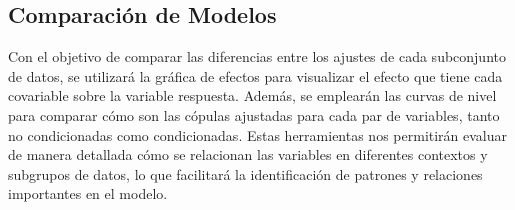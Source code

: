 
\subsection{Comparación de Modelos}

Con el objetivo de comparar las diferencias entre los ajustes de cada subconjunto de datos, se utilizará la gráfica de efectos para visualizar el efecto que tiene cada covariable sobre la variable respuesta. Además, se emplearán las curvas de nivel para comparar cómo son las cópulas ajustadas para cada par de variables, tanto no condicionadas como condicionadas. Estas herramientas nos permitirán evaluar de manera detallada cómo se relacionan las variables en diferentes contextos y subgrupos de datos, lo que facilitará la identificación de patrones y relaciones importantes en el modelo.


\begin{figure}[H]
 \centering
\end{figure}

